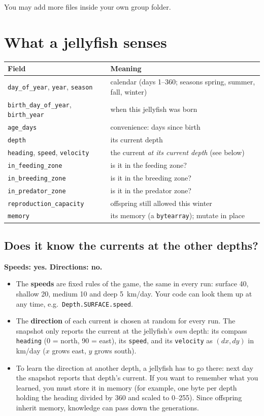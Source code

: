 \documentclass[11pt]{article}
\begin{document}
\medskip
You may add more files inside your own group folder.

\section{What a jellyfish senses}
\label{sec:senses}

\begin{tabular}{@{}p{}p{}@{}}
\toprule
\textbf{Field} & \textbf{Meaning} \\
\midrule
\texttt{day\_of\_year}, \texttt{year}, \texttt{season} & calendar (days 1--360; seasons spring, summer, fall, winter) \\
\texttt{birth\_day\_of\_year}, \texttt{birth\_year} & when this jellyfish was born \\
\texttt{age\_days} & convenience: days since birth \\
\texttt{depth} & its current depth \\
\texttt{heading}, \texttt{speed}, \texttt{velocity} & the current \emph{at its current depth} (see below) \\
\texttt{in\_feeding\_zone} & is it in the feeding zone? \\
\texttt{in\_breeding\_zone} & is it in the breeding zone? \\
\texttt{in\_predator\_zone} & is it in the predator zone? \\
\texttt{reproduction\_capacity} & offspring still allowed this winter \\
\texttt{memory} & its memory (a \texttt{bytearray}); mutate in place \\
\bottomrule
\end{tabular}

\subsection{Does it know the currents at the other depths?}

\textbf{Speeds: yes. Directions: no.}

\begin{itemize}[leftmargin=*]
  \item The \textbf{speeds} are fixed rules of the game, the same in every
  run: surface 40, shallow 20, medium 10 and deep 5~km/day. Your code can
  look them up at any time, e.g.\ \texttt{Depth.SURFACE.speed}.
  \item The \textbf{direction} of each current is chosen at random for
  every run. The snapshot only reports the current at the jellyfish's
  \emph{own} depth: its compass \texttt{heading} (0 = north, 90 = east),
  its \texttt{speed}, and its \texttt{velocity} as $(dx, dy)$ in km/day
  ($x$ grows east, $y$ grows south).
  \item To learn the direction at another depth, a jellyfish has to go
  there: next day the snapshot reports that depth's current. If you want
  to remember what you learned, you must store it in memory (for example,
  one byte per depth holding the heading divided by 360 and scaled to
  0--255). Since offspring inherit memory, knowledge can pass down the
  generations.
\end{itemize}
\end{document}
